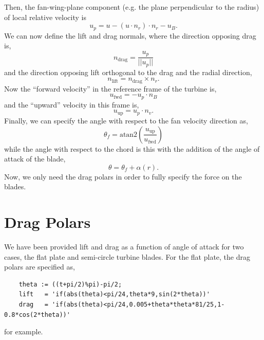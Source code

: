 \documentclass{article}
\begin{document}
Then, the fan-wing-plane component (e.g. the plane perpendicular to the 
radius) of local relative velocity is
\begin{equation}
u_p = u - (u\cdot n_r)\cdot n_r - u_B. 
\end{equation}
We can now define the lift and drag normals, where the direction
opposing drag is, 
\begin{equation}
n_{\text{drag}} = \frac{u_p}{||u_p||} 
\end{equation}
and the direction opposing lift orthogonal to the drag and the radial direction, 
\begin{equation}
n_{\text{lift}}= n_{\text{drag}} \times n_r. 
\end{equation}
Now the ``forward velocity'' in the reference frame of the turbine is, 
\begin{equation}
u_{\text{fwd}}= -u_p \cdot n_B
\end{equation}
and the ``upward'' velocity in this frame is, 
\begin{equation}
u_{\text{up}} = u_p \cdot n_v. 
\end{equation}
Finally, we can specify the angle with respect to the fan velocity
direction as, 
\begin{equation}
 \theta_f = \text{atan2}\left(\frac{u_{\text{up}}}{u_{\text{fwd}}}\right)
\end{equation}
while the angle with respect to the chord is this with the addition of
the angle of attack of the blade, 
\begin{equation}
 \theta = \theta_f + \alpha(r).
\end{equation}
Now, we only need the drag polars in order to fully specify the force
on the blades.

\newpage
\section{Drag Polars}

We have been provided lift and drag as a function of angle of attack for
two cases, the flat plate and semi-circle turbine blades. 
For the flat plate, the drag polars are specified as,

\begin{lstlisting}
    theta := ((t+pi/2)%pi)-pi/2; 
    lift   = 'if(abs(theta)<pi/24,theta*9,sin(2*theta))'
    drag   = 'if(abs(theta)<pi/24,0.005+theta*theta*81/25,1-0.8*cos(2*theta))'
\end{lstlisting}
for example. 
\end{document}
